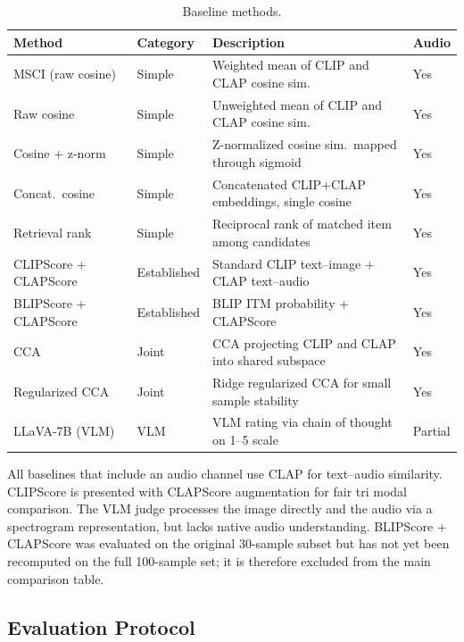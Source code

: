 \documentclass[a4paper,fleqn]{cas-sc}
\begin{document}
\begin{itemize}
\begin{table}[t]
\caption{Baseline methods.}\label{tab:baselines}
\centering
\small
\begin{tabular}{llp{4.2cm}l}
\toprule
Method & Category & Description & Audio \\
\midrule
MSCI (raw cosine) & Simple & Weighted mean of CLIP and CLAP cosine sim. & Yes \\
Raw cosine & Simple & Unweighted mean of CLIP and CLAP cosine sim. & Yes \\
Cosine + z-norm & Simple & Z-normalized cosine sim.\ mapped through sigmoid & Yes \\
Concat.\ cosine & Simple & Concatenated CLIP+CLAP embeddings, single cosine & Yes \\
Retrieval rank & Simple & Reciprocal rank of matched item among candidates & Yes \\
CLIPScore + CLAPScore & Established & Standard CLIP text--image + CLAP text--audio & Yes \\
BLIPScore + CLAPScore & Established & BLIP ITM probability + CLAPScore & Yes \\
CCA & Joint & CCA projecting CLIP and CLAP into shared subspace & Yes \\
Regularized CCA & Joint & Ridge regularized CCA for small sample stability & Yes \\
LLaVA-7B (VLM) & VLM & VLM rating via chain of thought on 1--5 scale & Partial \\
\bottomrule
\end{tabular}
\end{table}

All baselines that include an audio channel use CLAP for text--audio similarity. CLIPScore is presented with CLAPScore augmentation for fair tri modal comparison. The VLM judge processes the image directly and the audio via a spectrogram representation, but lacks native audio understanding. BLIPScore + CLAPScore was evaluated on the original 30-sample subset but has not yet been recomputed on the full 100-sample set; it is therefore excluded from the main comparison table.

\subsection{Evaluation Protocol}\label{sec:eval-protocol}

\begin{itemize}


\end{itemize}
\end{itemize}
\end{document}
